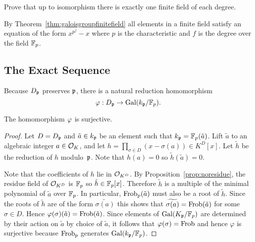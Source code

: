 \begin{exercise}
	Prove that up to isomorphism there is
	exactly one finite field of each degree.

	\begin{hint}
		By Theorem~\ref{thm:galoisgroupfinitefield}
		all elements in a finite field satisfy an equation
		of the form $x^{p^f} - x$ where $p$ is the
		characteristic and $f$ is the degree over the
		field $\mathbb{F}_p$.
	\end{hint}
\end{exercise}


\subsection{The Exact Sequence}\label{sec:exactseq}

Because $D_{\mathfrak{p}}$ preserves $\mathfrak{p}$, there is a natural reduction homomorphism
$$
	\varphi:D_{\mathfrak{p}} \to \operatorname{Gal}(k_{\mathfrak{p}}/\mathbb{F}_p).
$$
\begin{theorem}\label{thm:redsurj}
	The homomorphism $\varphi$ is surjective.
\end{theorem}
\begin{proof}
	Let $D = D_{\mathfrak{p}}$ and $\tilde{a} \in  k_{\mathfrak{p}}$ be an element
	such that $ k_{\mathfrak{p}} = \mathbb{F}_p(\tilde{a})$.
	Lift $\tilde{a}$ to an algebraic integer $a\in \mathcal{O}_K$, and let
	$h=\prod_{\sigma\in {D}}(x-\sigma(a))\in K^D[x]$.
	Let $\tilde{h}$ be the reduction of $h$ modulo~$\mathfrak{p}$.
	Note that $h(a) = 0$ so $\tilde{h}(\tilde{a}) = 0$.
	
	Note that the coefficients of $h$ lie in $\mathcal{O}_{K^D}$.
	By Proposition~\ref{prop:noresidue}, the residue field of $\mathcal{O}_{K^D}$
	is $\mathbb{F}_p$ so $\tilde{h}\in\mathbb{F}_p[x]$.
	Therefore $\tilde{h}$ is a multiple of the minimal polynomial of
	$\tilde{a}$ over $\mathbb{F}_p$. In particular, $\operatorname{Frob}_p(\tilde{a})$
	must also be a root of $\tilde{h}$.
	Since the roots of $\tilde{h}$ are of the form
	$\widetilde{\sigma(a)}$ this shows that
	$\widetilde{\sigma(a)} = \operatorname{Frob}(\tilde{a})$ for some $\sigma\in D$.
	Hence $\varphi(\sigma)(\tilde{a}) = \operatorname{Frob}(\tilde{a})$. Since elements
	of $\operatorname{Gal}(K_{\mathfrak{p}}/\mathbb{F}_p)$ are determined by their action on $\tilde{a}$
	by choice of $\tilde{a}$, it follows that $\varphi(\sigma) = \operatorname{Frob}$
	and hence $\varphi$ is surjective because $\operatorname{Frob}_p$
	generates $\operatorname{Gal}(k_{\mathfrak{p}}/\mathbb{F}_p)$.
\end{proof}

